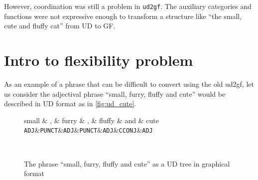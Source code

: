 However, coordination was still a problem in \verb|ud2gf|. The auxiliary categories and functions were not expressive enough to transform a structure like ``the small, cute and fluffy cat'' from UD to GF.





\section{Intro to flexibility problem}

As an example of a phrase that can be difficult to convert using the old ud2gf, let us consider the adjectival phrase ``small, furry, fluffy and cute''
would be described in UD format as in \autoref{fig:ud_cute}.



\begin{figure}
    \centering
    \begin{dependency}
        \begin{deptext}[column sep=0.4cm]
              small \& , \& furry \&  , \& fluffy \& and \& cute \\
            {\tt ADJ}\&{\tt PUNCT}\&{\tt ADJ}\&{\tt PUNCT}\&{\tt ADJ}\&{\tt CCONJ}\&{\tt ADJ}\\
        \end{deptext}
    \end{dependency} \\
    \caption{The phrase ``small, furry, fluffy and cute'' as a UD tree in graphical format}
    \label{fig:ud_cute}
\end{figure}
% 

